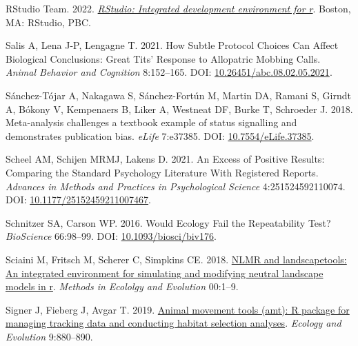 \documentclass[10pt,a4paper]{article}
\newlength{\cslhangindent}
\newlength{\cslentryspacingunit} %
\newenvironment{CSLReferences}[2] %
 {%
  \setlength{\parindent}{0pt}
  \ifodd #1
  \let\oldpar\par
  \def\par{\hangindent=\cslhangindent\oldpar}
  \fi
  \setlength{\parskip}{#2\cslentryspacingunit}
 }%
 {}
\begin{document}
\begin{CSLReferences}{1}{0}
\leavevmode{}%
RStudio Team. 2022. \emph{\href{http://www.rstudio.com/}{RStudio: Integrated development environment for r}}. Boston, MA: RStudio, PBC.

\leavevmode{}%
Salis A, Lena J-P, Lengagne T. 2021. How {Subtle} {Protocol} {Choices} {Can} {Affect} {Biological} {Conclusions}: {Great} {Tits}' {Response} to {Allopatric} {Mobbing} {Calls}. \emph{Animal Behavior and Cognition} 8:152--165. DOI: \href{https://doi.org/10.26451/abc.08.02.05.2021}{10.26451/abc.08.02.05.2021}.

\leavevmode{}%
Sánchez-Tójar A, Nakagawa S, Sánchez-Fortún M, Martin DA, Ramani S, Girndt A, Bókony V, Kempenaers B, Liker A, Westneat DF, Burke T, Schroeder J. 2018. Meta-analysis challenges a textbook example of status signalling and demonstrates publication bias. \emph{eLife} 7:e37385. DOI: \href{https://doi.org/10.7554/eLife.37385}{10.7554/eLife.37385}.

\leavevmode{}%
Scheel AM, Schijen MRMJ, Lakens D. 2021. An {Excess} of {Positive} {Results}: {Comparing} the {Standard} {Psychology} {Literature} {With} {Registered} {Reports}. \emph{Advances in Methods and Practices in Psychological Science} 4:251524592110074. DOI: \href{https://doi.org/10.1177/25152459211007467}{10.1177/25152459211007467}.

\leavevmode{}%
Schnitzer SA, Carson WP. 2016. Would {Ecology} {Fail} the {Repeatability} {Test}? \emph{BioScience} 66:98--99. DOI: \href{https://doi.org/10.1093/biosci/biv176}{10.1093/biosci/biv176}.

\leavevmode{}%
Sciaini M, Fritsch M, Scherer C, Simpkins CE. 2018. \href{https://doi.org/10.1111/2041-210X.13076}{NLMR and landscapetools: An integrated environment for simulating and modifying neutral landscape models in r}. \emph{Methods in Ecololgy and Evolution} 00:1--9.

\leavevmode{}%
Signer J, Fieberg J, Avgar T. 2019. \href{https://doi.org/10.1002/ece3.4823}{Animal movement tools (amt): R package for managing tracking data and conducting habitat selection analyses}. \emph{Ecology and Evolution} 9:880--890.


\end{CSLReferences}
\end{document}
